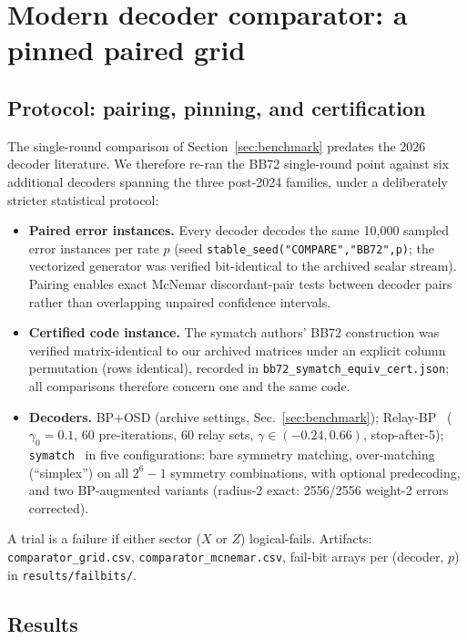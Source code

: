 \documentclass[11pt,a4paper]{article}
\begin{document}
\section{Modern decoder comparator: a pinned paired grid}
\label{sec:comparator}

\subsection{Protocol: pairing, pinning, and certification}

The single-round comparison of Section~\ref{sec:benchmark} predates the 2026
decoder literature. We therefore re-ran the BB72 single-round point against
six additional decoders spanning the three post-2024 families, under a
deliberately stricter statistical protocol:
\begin{itemize}
  \item \textbf{Paired error instances.} Every decoder decodes the same
  10{,}000 sampled error instances per rate $p$ (seed
  \texttt{stable\_seed("COMPARE","BB72",p)}; the vectorized generator was
  verified bit-identical to the archived scalar stream). Pairing enables
  exact McNemar discordant-pair tests between decoder pairs rather than
  overlapping unpaired confidence intervals.
  \item \textbf{Certified code instance.} The symatch authors' BB72
  construction was verified matrix-identical to our archived matrices under
  an explicit column permutation (rows identical), recorded in
  \texttt{bb72\_symatch\_equiv\_cert.json}; all comparisons therefore
  concern one and the same code.
  \item \textbf{Decoders.} BP+OSD (archive settings, Sec.~\ref{sec:benchmark});
  Relay-BP~\cite{Muller2025relay} ($\gamma_0=0.1$, 60 pre-iterations, 60
  relay sets, $\gamma\in(-0.24,0.66)$, stop-after-5);
  \texttt{symatch}~\cite{SahayBrown2026} in five configurations: bare
  symmetry matching, over-matching (``simplex'') on all $2^6-1$ symmetry
  combinations, with optional predecoding, and two BP-augmented variants
  (radius-2 exact: 2556/2556 weight-2 errors corrected).
\end{itemize}
A trial is a failure if either sector ($X$ or $Z$) logical-fails.
Artifacts: \texttt{comparator\_grid.csv}, \texttt{comparator\_mcnemar.csv},
fail-bit arrays per (decoder, $p$) in \texttt{results/failbits/}.

\subsection{Results}
\end{document}
